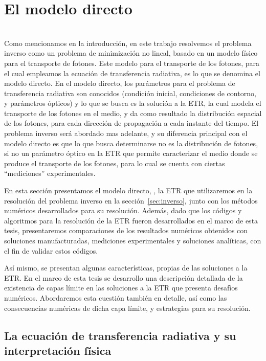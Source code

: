 \chapter{El modelo directo}
\lhead{\thepage}
 \\


Como mencionamos en la introducción, en este trabajo resolvemos el problema inverso 
como un problema de minimización no lineal, basado en un modelo físico para 
el transporte de fotones. Este modelo para el transporte de los fotones, 
para el cual empleamos la ecuación de transferencia radiativa, es lo que 
se denomina el modelo directo. En el modelo directo, los parámetros 
 para el problema de transferencia radiativa son conocidos (condición inicial, condiciones de contorno, 
y parámetros ópticos) y lo que se busca es la solución a la ETR, la cual modela 
el transporte de los fotones en el medio, y da como resultado la distribución 
espacial de los fotones, para cada dirección de propagación a cada instante del tiempo. 
El problema inverso será abordado mas adelante, 
y su diferencia principal con el modelo directo es que lo que busca 
determinarse no es la distribución de fotones, si no un parámetro óptico en la ETR 
que permite caracterizar el medio donde se produce el transporte de los fotones, 
para lo cual se cuenta con ciertas ``mediciones'' experimentales.

En esta sección presentamos el modelo directo, \ie, 
la ETR que utilizaremos 
en la resolución del problema inverso en la sección~\ref{sec:inverso}, 
junto con los métodos numéricos desarrollados para su resolución. 
Además, dado que los códigos y algoritmos para la resolución de la ETR 
fueron desarrollados en el marco de esta tesis, presentaremos 
comparaciones de los resultados numéricos obtenidos con soluciones manufacturadas, 
mediciones experimentales y soluciones analíticas, con el fin de validar estos códigos.  

Así mismo, se presentan algunas características, propias de las soluciones 
a la ETR. En el marco de esta tesis se desarrollo una descripción detallada 
de la existencia de capas límite en las soluciones a la ETR que 
presenta desafíos numéricos. Abordaremos esta cuestión también en detalle, 
así como las consecuencias numéricas de dicha capa límite, y 
estrategias para su resolución. 


\section{La ecuación de transferencia radiativa y su interpretación física}
\label{sec:ETR}

